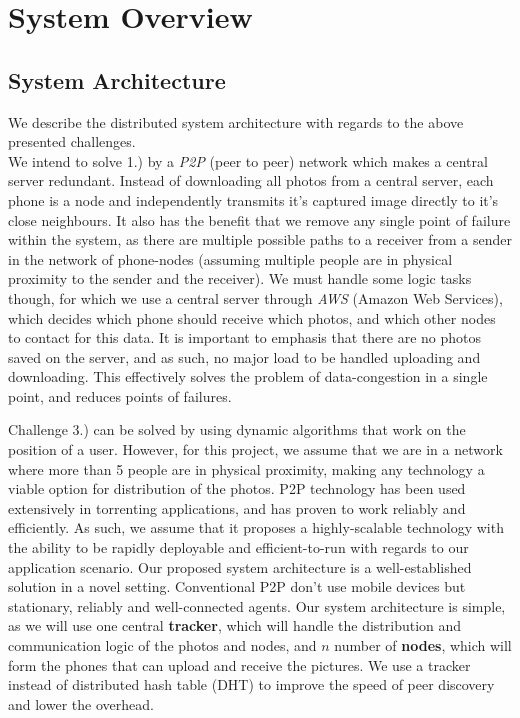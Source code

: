 \documentclass{report}
\begin{document}
\section{System Overview}


\subsection{System Architecture}
We describe the distributed system architecture with regards to the above presented challenges. \\

We intend to solve 1.) by a \textit{P2P} (peer to peer) network which makes a central server redundant.
Instead of downloading all photos from a central server, each phone is a node and independently transmits it's captured image directly to it's close neighbours. 
It also has the benefit that we remove any single point of failure within the system, as there are multiple possible paths to a receiver from a sender in the network of phone-nodes (assuming multiple people are in physical proximity to the sender and the receiver). 
We must handle some logic tasks though, for which we use a central server through \textit{AWS} (Amazon Web Services), which decides which phone should receive which photos, and which other nodes to contact for this data. 
It is important to emphasis that there are no photos saved on the server, and as such, no major load to be handled uploading and downloading.
This effectively solves the problem of data-congestion in a single point, and reduces points of failures. 

Challenge 3.) can  be solved by using dynamic algorithms that work on the position of a user. 
However, for this project, we assume that we are in a network where more than 5 people are in physical proximity, making any technology a viable option for distribution of the photos.
\newline
P2P technology has been used extensively in torrenting applications, and has proven to work reliably and efficiently. 
As such, we assume that it proposes a highly-scalable technology with the ability to be rapidly deployable and efficient-to-run with regards to our application scenario.
Our proposed system architecture is a well-established solution in a novel setting.
Conventional P2P don't use mobile devices but stationary, reliably and well-connected agents. 
Our system architecture is simple, as we will use one central \textbf{tracker}, which will handle the distribution and communication logic of the photos and nodes, and $ n $ number of \textbf{nodes}, which will form the phones that can upload and receive the pictures.
We use a tracker instead of distributed hash table (DHT) to improve the speed of peer discovery and lower the overhead.
\end{document}
